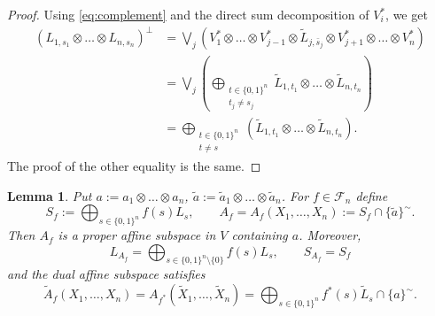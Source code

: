 \documentclass[12pt]{article}
\newtheorem{lemma}{Lemma}
\theoremstyle{definition}
\theoremstyle{remark}
\def\Fe{\mathcal F}
\begin{document}
\begin{proof} Using \eqref{eq:complement} and the direct sum decomposition of $V_i^*$, we get
\begin{align*}
\left(L_{1,s_{1}}\otimes \dots\otimes L_{n,s_{n}}\right)^\perp&= \bigvee_j\left(
V_{1}^*\otimes
\dots \otimes V_{j-1}^*\otimes \tilde L_{j,\bar s_{j}}\otimes V_{j+1}^*\otimes\dots \otimes
V_{n}^*\right)\\
&= \bigvee_j \left( \bigoplus_{\substack{t\in \{0,1\}^n\\ t_{j}\ne s_{j}}} \tilde
L_{1,t_{1}}\otimes\dots \otimes \tilde
L_{n,t_{n}}\right)\\
&= \bigoplus_{\substack{t\in \{0,1\}^n\\ t\ne s}} \left( \tilde L_{1,t_{1}}\otimes\dots \otimes \tilde
L_{n,t_{n}}\right).
\end{align*}
The proof of the other equality is the same.

\end{proof}



\begin{lemma}\label{lemma:Xf} Put $a:= a_1\otimes\dots \otimes  a_n$, $\tilde a:= \tilde
a_1\otimes\dots\otimes  \tilde a_n$.
For  $f\in \Fe_n$ define 
\[
S_f:=\bigoplus_{s\in \{0,1\}^n} f(s)L_s,\qquad A_f=A_f(X_1,\dots,X_n):=S_f\cap \{\tilde a\}^\sim.
\]
Then $A_f$ is a proper affine subspace in $V$ containing $a$. Moreover,
\[
L_{A_f}=\bigoplus_{s\in\{0,1\}^n\setminus\{0\}} f(s)L_s,\qquad S_{A_f}=S_f
\]
and the dual affine subspace satisfies  
\[
\tilde A_f(X_1,\dots,X_n)=A_{f^*}(\tilde X_1,\dots, \tilde X_n)=\bigoplus_{s\in \{0,1\}^n}
f^*(s)\tilde L_s\cap\{a\}^\sim .
\]
 


\end{lemma}
\end{document}
